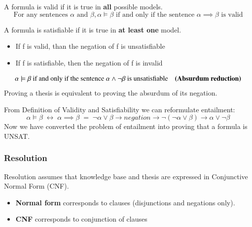 \begin{tcolorbox}[colback=red!5!white,colframe=red!75!black,title=\textbf{Validity Definition}, label=def:validity]
    \label{def:val}
    A formula is valid if it is true in \textbf{all} possible models.
    \begin{equation*}
        \text{For any sentences } \alpha \text{ and } \beta, \alpha \models \beta \text{ if and only if the sentence }\alpha\implies\beta \text{ is valid}
    \end{equation*}
\end{tcolorbox}
\begin{tcolorbox}[label=def:sat,colback=red!5!white,colframe=red!75!black,title=\textbf{Satisfiability Definition}]
    \label{def:sat}
    A formula is satisfiable if it is true in \textbf{at least one} model.
    \begin{itemize}
        \item If f is valid, than the negation of f is unsatisfiable
        \item If f is satisfiable, then the negation of f is invalid
    \end{itemize}
    \begin{equation*}
        \alpha \models \beta \text{ if and only if the sentence }\alpha\land\lnot\beta \text{ is unsatisfiable} \quad \text{\textbf{(Absurdum reduction)}}
    \end{equation*}
    Proving a thesis is equivalent to proving the absurdum of its negation.
\end{tcolorbox}
From Definition of Validity and Satisfiability we can reformulate entailment:
\begin{equation*}
    \alpha\models\beta\;\leftrightarrow\;\alpha\implies\beta\;=\;\lnot\alpha\lor\beta\rightarrow negation \rightarrow \lnot(\lnot\alpha\lor\beta)\rightarrow \alpha\lor\lnot\beta
\end{equation*}
Now we have converted the problem of entailment into proving that a formula is UNSAT.

\subsubsection{Resolution}
Resolution assumes that knowledge base and thesis are expressed in Conjunctive
Normal Form (CNF).
\begin{itemize}
    \item \textbf{Normal form} corresponds to clauses (disjunctions and negations only).
    \item \textbf{CNF} corresponds to conjunction of clauses
\end{itemize}